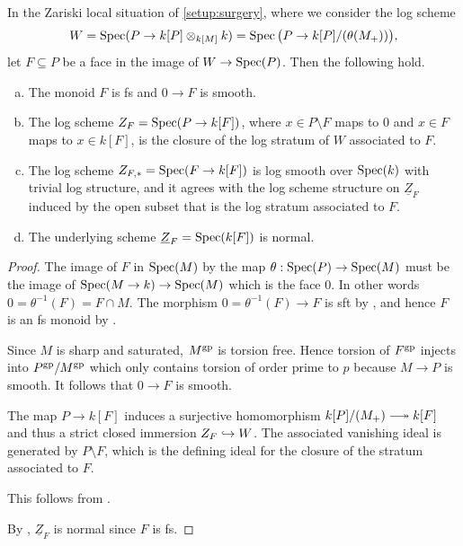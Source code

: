 \begin{lem} \label{lem:strata-closures}
     In the Zariski local situation of \cref{setup:surgery}, where we consider the log scheme  
    \[
         W = \operatorname{Spec}(P\to k[P]\otimes_{k[M]} k) = \operatorname{Spec}\big(P\to k[P]/(\theta(M_+))\big),
    \]  
    let $F \subseteq P$ be a face in the image of $W \to \operatorname{Spec}(P)$. Then the following hold.
    \begin{enumerate}[(a)]
        \item  \label{lemitem:strata-closures1}
        The monoid $F$ is fs and $0 \to F$ is smooth.
        
        \item \label{lemitem:strata-closures2}
        The log scheme $Z_F = \operatorname{Spec}(P \to k[F])$, where $x \in P \setminus F$ maps to $0$ and $x \in F$ maps to $x \in k[F]$, is the closure of the log stratum of $W$ associated to $F$.
        
        \item  \label{lemitem:strata-closures3}
        The log scheme $Z_{F,\ast} = \operatorname{Spec}(F \to k[F])$ is log smooth over $\operatorname{Spec}(k)$ with trivial log structure, and it agrees with the log scheme structure on $\underline{Z}_F$ induced by the open subset that is the log stratum associated to $F$.
        
        \item  \label{lemitem:strata-closures4}
        The underlying scheme $\underline{Z}_F = \operatorname{Spec}(k[F])$ is normal.
    \end{enumerate}
\end{lem}
\begin{proof}
     The image of $F$ in $\operatorname{Spec}(M)$ by the map $\theta: \operatorname{Spec}(P) \to \operatorname{Spec}(M)$ must be the image of $\operatorname{Spec}(M \to k) \to \operatorname{Spec}(M)$ which is the face $0$. In other words $0 = \theta^{-1}(F) = F \cap M$. The morphism $0 = \theta^{-1}(F) \to F$ is sft by \cite[Lemma~2.3.2]{AHLS-Log}, and hence $F$ is an fs monoid by \cite[Proposition~2.2.9]{AHLS-Log}.    

    Since $M$ is sharp and saturated, $M^{\rm gp}$ is torsion free. Hence torsion of $F^{\rm gp}$ injects into $P^{\rm gp}/M^{\rm gp}$ which only contains torsion of order prime to $p$ because $M \to P$ is smooth. It follows that $0 \to F$ is smooth. 

    The map $P \to k[F]$ induces a surjective homomorphism $k[P]/(M_+) \surj k[F]$ and thus a strict closed immersion $Z_F \hookrightarrow W$. The associated vanishing ideal is generated by $P \setminus F$, which is the defining ideal for the closure of the stratum associated to $F$.

     This follows from .

    By \cite[Proposition I.3.4.1]{Ogus}, $\underline{Z}_F$ is normal since $F$ is fs. 
\end{proof}

